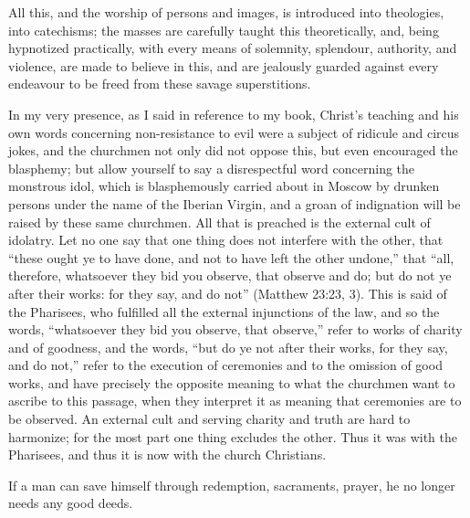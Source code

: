 \documentclass{book}
\begin{document}
All this, and the worship of persons and images, is introduced into theologies, into catechisms; the masses are carefully taught this theoretically, and, being hypnotized practically, with every means of solemnity, splendour, authority, and violence, are made to believe in this, and are jealously guarded against every endeavour to be freed from these savage superstitions.

In my very presence, as I said in reference to my book, Christ’s teaching and his own words concerning non-resistance to evil were a subject of ridicule and circus jokes, and the churchmen not only did not oppose this, but even encouraged the blasphemy; but allow yourself to say a disrespectful word concerning the monstrous idol, which is blasphemously carried about in Moscow by drunken persons under the name of the Iberian Virgin, and a groan of indignation will be raised by these same churchmen. All that is preached is the external cult of idolatry. Let no one say that one thing does not interfere with the other, that “these ought ye to have done, and not to have left the other undone,” that “all, therefore, whatsoever they bid you observe, that observe and do; but do not ye after their works: for they say, and do not” (Matthew 23:23, 3). This is said of the Pharisees, who fulfilled all the external injunctions of the law, and so the words, “whatsoever they bid you observe, that observe,” refer to works of charity and of goodness, and the words, “but do ye not after their works, for they say, and do not,” refer to the execution of ceremonies and to the omission of good works, and have precisely the opposite meaning to what the churchmen want to ascribe to this passage, when they interpret it as meaning that ceremonies are to be observed. An external cult and serving charity and truth are hard to harmonize; for the most part one thing excludes the other. Thus it was with the Pharisees, and thus it is now with the church Christians.

If a man can save himself through redemption, sacraments, prayer, he no longer needs any good deeds.
\end{document}
